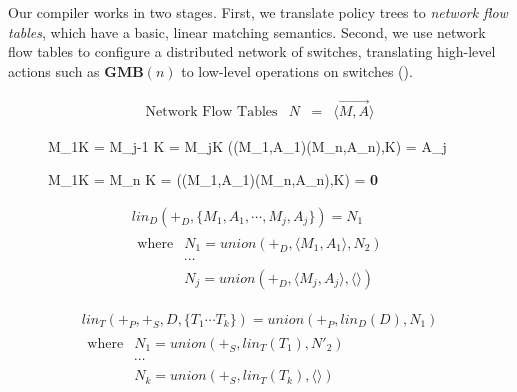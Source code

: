 Our compiler works in two stages. First, we translate policy trees to
\emph{network flow tables}, which have a basic,
linear matching semantics. Second, we use
network flow tables to configure a distributed network of switches,
translating high-level actions such as $\textbf{GMB}(n)$ to low-level
operations on switches ().

\begin{figure}[t]

\begin{displaymath}
\begin{array}{lrcl}
\textrm{Network Flow Tables} & N & = & \langle \overrightarrow{M,A} \rangle
\end{array}
\end{displaymath}


\medskip

\inference
{M_1\cap K = \emptyset \cdots M_{j-1} \cap K = \emptyset \qquad
 M_j\cap K \ne \emptyset }
{(\langle(M_1,A_1)\cdots(M_n,A_n)\rangle,K) = A_j}

\medskip

\inference
{M_1\cap K = \emptyset \cdots M_{n} \cap K = \emptyset}
{(\langle(M_1,A_1)\cdots(M_n,A_n)\rangle,K) = \textbf{0}}


\medskip

\begin{displaymath}
\begin{array}{l}
\mathit{lin}_D\left(+_D,\{M_1,A_1, \cdots, M_j,A_j \}\right) 
  = N_1 \\
\begin{array}{lllll}
\textrm{where} 
& N_1 = \mathit{union}(+_D,\langle M_1,A_1\rangle, N_2) \\
& \cdots \\
& N_j = \mathit{union}(+_D, \langle M_j,A_j\rangle, \langle\rangle)
\end{array}
\end{array}
\end{displaymath}

\begin{displaymath}
\begin{array}{l}
\mathit{lin}_T\left(+_P,+_S,D, \{T_1\cdots T_k\}\right)
  = \mathit{union}(+_P,\mathit{lin}_D(D), N_1) \\
\begin{array}{lllll}
\textrm{where} 
& N_1 = \mathit{union}(+_S, \mathit{lin}_T(T_1), N'_2) \\
& \cdots \\
& N_k = \mathit{union}(+_S,\mathit{lin}_T(T_k), \langle \rangle)
\end{array}
\end{array}
\end{displaymath}


\end{figure}

